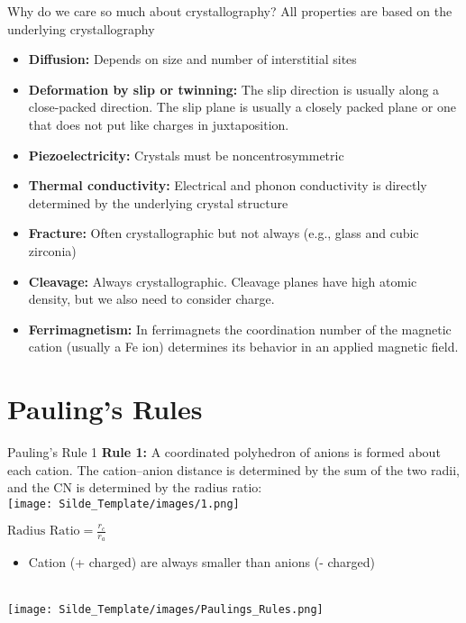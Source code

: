 \documentclass{libs/XJTLU_format}
\begin{document}
\begin{frame}{Why do we care so much about crystallography?}
All properties are based on the underlying crystallography \pause

\begin{itemize}
    \item \textbf{Diffusion:} Depends on size and number of interstitial sites \pause
    \item \textbf{Deformation by slip or twinning:}  The slip direction is usually along a close-packed direction. The slip plane is usually a closely packed plane or one that does not put like charges in juxtaposition. 
    \pause
    \item \textbf{Piezoelectricity:} Crystals must be noncentrosymmetric
    \pause
    \item \textbf{Thermal conductivity:} Electrical and phonon conductivity is directly determined by the underlying crystal structure
    \pause
    \item \textbf{Fracture:} Often crystallographic but not always (e.g., glass and cubic zirconia)
    \pause
    \item \textbf{Cleavage:} Always crystallographic. Cleavage planes have high atomic density, but we also need to consider charge.
    \pause
    \item \textbf{Ferrimagnetism:} In ferrimagnets the coordination number of the magnetic cation (usually a Fe ion) determines its behavior in an applied magnetic field.
\end{itemize}
\end{frame}

\section{Pauling's Rules}
\begin{frame}{Pauling's Rule 1}
    \textbf{Rule 1:} A coordinated polyhedron of anions is formed about each cation. The cation–anion distance is determined by the sum of the two radii, and the CN is determined by the radius ratio:\\[1em]
    
    \centering
    \texttt{[image: Silde\_Template/images/1.png]}
    
    $\textrm{Radius Ratio} = \frac{r_c}{r_a}$
    \pause
    \begin{itemize}
        \item Cation (+ charged) are always smaller than anions (- charged)
    \end{itemize}\\[1em]
    
    \pause
    \texttt{[image: Silde\_Template/images/Paulings\_Rules.png]}

\end{frame}
\end{document}
